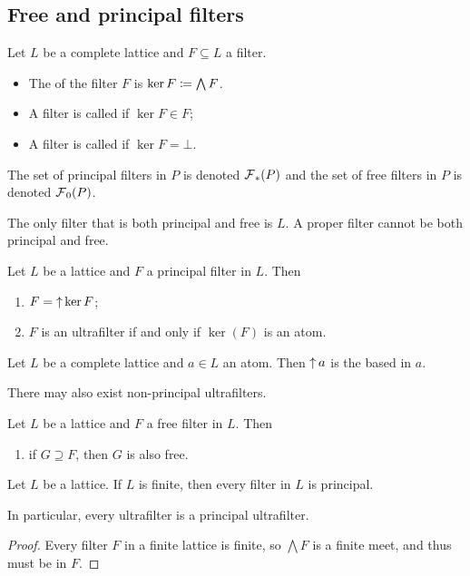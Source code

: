 \subsection{Free and principal filters}
\begin{definition}
Let $L$ be a complete lattice and $F\subseteq L$ a filter.
\begin{itemize}
\item The  of the filter $F$ is $\ker F \coloneqq \bigwedge F$.
\item A filter is called  if $\ker F \in F$;
\item A filter is called  if $\ker F = \bot$.
\end{itemize}
The set of principal filters in $P$ is denoted $\operatorname{\mathcal{F}}_*(P)$ and the set of free filters in $P$ is denoted $\operatorname{\mathcal{F}}_0(P)$.
\end{definition}
The only filter that is both principal and free is $L$. A proper filter cannot be both principal and free.

\begin{lemma}
Let $L$ be a lattice and $F$ a principal filter in $L$. Then
\begin{enumerate}
\item $F = \operatorname{\uparrow} \ker F$;
\item $F$ is an ultrafilter \textup{if and only if} $\ker(F)$ is an atom.
\end{enumerate}
\end{lemma}

\begin{definition}
Let $L$ be a complete lattice and $a\in L$ an atom. Then $\operatorname{\uparrow} a$ is the  based in $a$.
\end{definition}
There may also exist non-principal ultrafilters.

\begin{lemma}
Let $L$ be a lattice and $F$ a free filter in $L$. Then
\begin{enumerate}
\item if $G\supseteq F$, then $G$ is also free.
\end{enumerate}
\end{lemma}

\begin{lemma} \label{finiteFiltersPrincipal}
Let $L$ be a lattice. If $L$ is finite, then every filter in $L$ is principal.
\end{lemma}
In particular, every ultrafilter is a principal ultrafilter.
\begin{proof}
Every filter $F$ in a finite lattice is finite, so $\bigwedge F$ is a finite meet, and thus must be in $F$.
\end{proof}

